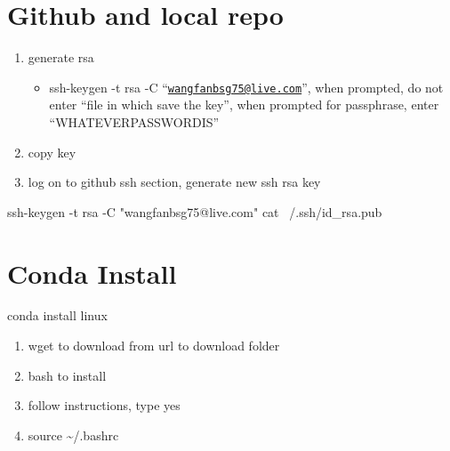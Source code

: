 \documentclass[]{article}
\newenvironment{Shaded}{\begin{snugshade}}{\end{snugshade}}
\newcommand{\FunctionTok}[1]{\textcolor[rgb]{0.00,0.00,0.00}{#1}}
\newcommand{\NormalTok}[1]{#1}
\newcommand{\StringTok}[1]{\textcolor[rgb]{0.31,0.60,0.02}{#1}}
\providecommand{\tightlist}{%
  \setlength{\itemsep}{0pt}\setlength{\parskip}{0pt}}
\begin{document}
\hypertarget{github-and-local-repo}{%
\section{Github and local repo}\label{github-and-local-repo}}

\begin{enumerate}
\def\labelenumi{\arabic{enumi}.}
\tightlist
\item
  generate rsa

  \begin{itemize}
  \tightlist
  \item
    ssh-keygen -t rsa -C
    ``\href{mailto:wangfanbsg75@live.com}{\nolinkurl{wangfanbsg75@live.com}}'',
    when prompted, do not enter ``file in which save the key'', when
    prompted for passphrase, enter ``WHATEVERPASSWORDIS''
  \end{itemize}
\item
  copy key
\item
  log on to github ssh section, generate new ssh rsa key
\end{enumerate}

\begin{Shaded}
\begin{Highlighting}[]
\FunctionTok{ssh-keygen}\NormalTok{ -t rsa -C }\StringTok{"wangfanbsg75@live.com"}
\FunctionTok{cat}\NormalTok{ ~/.ssh/id_rsa.pub}
\end{Highlighting}
\end{Shaded}

\hypertarget{conda-install}{%
\section{Conda Install}\label{conda-install}}

conda install linux

\begin{enumerate}
\def\labelenumi{\arabic{enumi}.}
\tightlist
\item
  wget to download from url to download folder
\item
  bash to install
\item
  follow instructions, type yes
\item
  source \textasciitilde{}/.bashrc
\end{enumerate}
\end{document}
